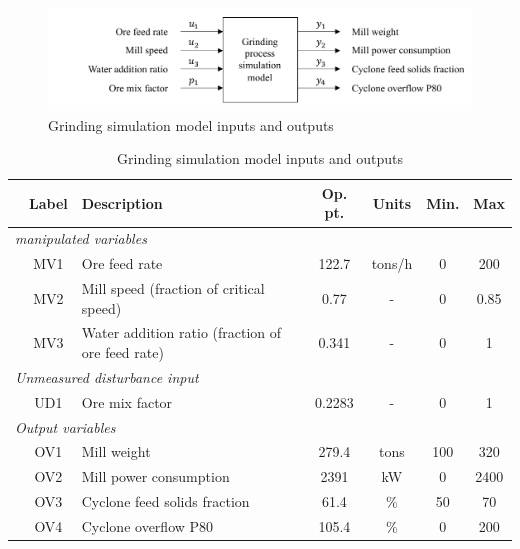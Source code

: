 \begin{figure}[htp]
	\centering
	\includegraphics[width=15cm]{images/grind_sim_io_diag.pdf}
	\caption{Grinding simulation model inputs and outputs}
	\label{fig:grind_sim_io_diag}
\end{figure}

\begin{table}[h!]
	\centering
	\caption{Grinding simulation model inputs and outputs} \label{tb:grind-vars}
	\begin{tabular}{c c >{\raggedright}p{5.5cm} c c c c}
		& Label & Description & Op. pt. & Units & Min. & Max \\
		\midrule
		\multicolumn{7}{l}{\textit{manipulated variables}} \\
		  & MV1       & Ore feed rate & 122.7 & tons/h & 0 & 200 \\   
		  & MV2       & Mill speed (fraction of critical speed) & 0.77 & - & 0 & 0.85 \\ 
		  & MV3       & Water addition ratio (fraction of ore feed rate) & 0.341 & - & 0 & 1 \\ 
		\multicolumn{7}{l}{\textit{Unmeasured disturbance input}} \\
		  & UD1        & Ore mix factor & 0.2283 & - & 0 & 1  \\ 
		\multicolumn{7}{l}{\textit{Output variables}} \\
		  & OV1        & Mill weight & 279.4 & tons & 100 & 320  \\ 
		  & OV2       & Mill power consumption & 2391 & kW & 0 & 2400  \\ 
		  & OV3       & Cyclone feed solids fraction & 61.4 & \% & 50 & 70  \\ 
		  & OV4       & Cyclone overflow P80 & 105.4 & \% & 0 & 200  \\ 
		\bottomrule
	\end{tabular}
\end{table}

